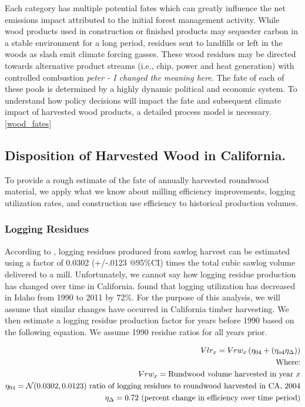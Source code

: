 \documentclass[a4paper]{article}
\begin{document}
Each category has multiple potential fates which can greatly influence the net emissions impact attributed to the initial forest management activity. While wood products used in construction or finished products may sequester carbon in a stable environment for a long period, residues sent to landfills or left in the woods as slash emit climate forcing gasses. These wood residues may be directed towards alternative product streams (i.e., chip, power and heat generation) with controlled combustion \emph{\emph{peter - I changed the  meaning here}}. The fate of each of these pools is determined by a highly dynamic political and economic system. To understand how policy decisions will impact the fate and subsequent climate impact of harvested wood products, a detailed process model is necessary. \ref{wood_fates}

\subsection{Disposition of Harvested Wood in California.}
\label{sec-3-1}
To provide a rough estimate of the fate of annually harvested roundwood material, we apply what we know about milling efficiency improvements, logging utilization rates, and construction use efficiency to historical production volumes. 

\subsubsection{Logging Residues}
\label{sec-3-1-1}
According to \citet{Morgan}, logging residues produced from sawlog harvest can be estimated using a factor of 0.0302 (+/-.0123 @95\%CI) times the total cubic sawlog volume delivered to a mill. Unfortunately, we cannot say how logging residue production has changed over time in California.  \citet{Simmons2014} found that logging utilization has decreased in Idaho from 1990 to 2011 by 72\%. For the purpose of this analysis, we will assume that similar changes have occurred in California timber harvesting. We then estimate a logging residue production factor for years before 1990 based on the following equation. We assume 1990 residue ratios for all years prior.


\begin{align*}
V\llap{--}lr_{x} = V\llap{--}rw_{x}\left(\eta_{04}+\left(\eta_{o4}\eta_\Delta\right)\right)\\
\text{Where:}\\
V\llap{--}rw_{x} = \text{Rundwood volume harvested in year }x\\
\eta_{04} = \mathcal{N}(0.0302,0.0123) \text{ ratio of logging residues to roundwood harvested in CA, 2004}\\
\eta_\Delta = 0.72 \text{ (percent change in efficiency over time period)}\\
\end{align*}
\end{document}
